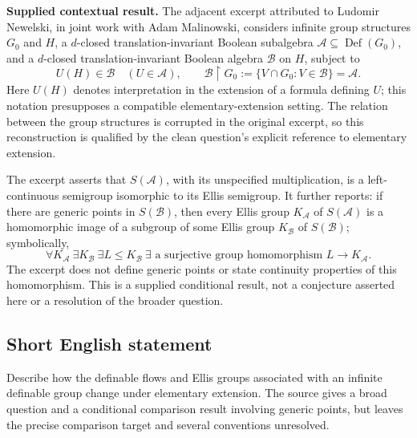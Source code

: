 \documentclass[11pt]{article}
\begin{document}
\textbf{Supplied contextual result.} The adjacent excerpt attributed to Ludomir Newelski, in joint work with Adam Malinowski, considers infinite group structures \(G_0\) and \(H\), a \(d\)-closed translation-invariant Boolean subalgebra \(\mathcal A\subseteq\operatorname{Def}(G_0)\), and a \(d\)-closed translation-invariant Boolean algebra \(\mathcal B\) on \(H\), subject to
\[
 U(H)\in\mathcal B\quad(U\in\mathcal A),\qquad
 \mathcal B\mathbin{\upharpoonright}G_0
 :=\{V\cap G_0:V\in\mathcal B\}=\mathcal A.
\]
Here \(U(H)\) denotes interpretation in the extension of a formula defining \(U\); this notation presupposes a compatible elementary-extension setting. The relation between the group structures is corrupted in the original excerpt, so this reconstruction is qualified by the clean question's explicit reference to elementary extension.

The excerpt asserts that \(S(\mathcal A)\), with its unspecified multiplication, is a left-continuous semigroup isomorphic to its Ellis semigroup. It further reports: if there are generic points in \(S(\mathcal B)\), then every Ellis group \(K_{\mathcal A}\) of \(S(\mathcal A)\) is a homomorphic image of a subgroup of some Ellis group \(K_{\mathcal B}\) of \(S(\mathcal B)\); symbolically,
\[
 \forall K_{\mathcal A}\ \exists K_{\mathcal B}\ \exists L\leq K_{\mathcal B}\ \exists\text{ a surjective group homomorphism }L\longrightarrow K_{\mathcal A}.
\]
The excerpt does not define generic points or state continuity properties of this homomorphism. This is a supplied conditional result, not a conjecture asserted here or a resolution of the broader question.
\subsection{Short English statement}
Describe how the definable flows and Ellis groups associated with an infinite definable group change under elementary extension. The source gives a broad question and a conditional comparison result involving generic points, but leaves the precise comparison target and several conventions unresolved.
\end{document}
